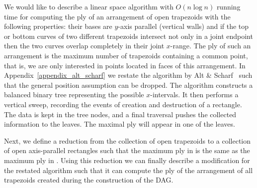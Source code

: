 We would like to describe a linear space
algorithm with $O(n\log n)$ running time
for computing the ply of an arrangement of
open trapezoids with the following properties:
their bases are $y$-axis parallel (vertical walls) and if
the top or bottom curves of two different trapezoids intersect
not only in a joint endpoint
then the two curves overlap completely in their joint $x$-range.
The ply of such an arrangement is the maximum
number of trapezoids containing a common point,
that is, we are only interested in points located
in faces of this arrangement.
In Appendix~\ref{appendix_alt_scharf} we restate the algorithm by Alt \& Scharf~\cite{as-cdaaa-13}
such that the general position assumption can be dropped.
The algorithm constructs a balanced binary tree representing the possible $x$-intervals.
It then performs a vertical sweep, recording the events of creation and destruction of a rectangle.
The data is kept in the tree nodes, and a final traversal pushes the collected information to the leaves.
The maximal ply will appear in one of the leaves.

Next, we define a reduction from
the collection of open trapezoids \Tall to a collection \Rall of
open axis-parallel rectangles such that the maximum ply in \Arr{\Rall}
is the same as the maximum ply in \Arr{\Tall}.
Using this reduction we can finally
describe a modification for the
restated algorithm such that it can compute the ply of
the arrangement of all trapezoids
created during the
construction of the DAG.




